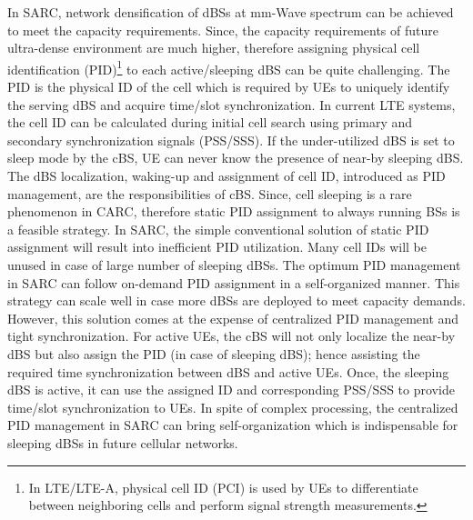\documentclass[article,10pt,twocolumn]{IEEEtran}
\begin{document}
In SARC, network densification of dBSs at mm-Wave spectrum can be achieved to meet the capacity requirements. Since, the capacity requirements of future ultra-dense environment are much higher, therefore assigning physical cell identification (PID)\footnote{In LTE/LTE-A, physical cell ID (PCI) is used by UEs to differentiate between neighboring cells and perform signal strength measurements.} to each active/sleeping dBS can be quite challenging. The PID is the physical ID of the cell which is required by UEs to uniquely identify the serving dBS and acquire time/slot synchronization. In current LTE systems, the cell ID can be calculated during initial cell search using primary and secondary synchronization signals (PSS/SSS). If the under-utilized dBS is set to sleep mode by the cBS, UE can never know the presence of near-by sleeping dBS. The dBS localization, waking-up and assignment of cell ID, introduced as PID management, are the responsibilities of cBS. Since, cell sleeping is a rare phenomenon in CARC, therefore static PID assignment to always running BSs is a feasible strategy. In SARC, the simple conventional solution of static PID assignment will result into inefficient PID utilization. Many cell IDs will be unused in case of large number of sleeping dBSs. The optimum PID management in SARC can follow on-demand PID assignment in a self-organized manner. This strategy can scale well in case more dBSs are deployed to meet capacity demands. However, this solution comes at the expense of centralized PID management and tight synchronization. For active UEs, the cBS will not only localize the near-by dBS but also assign the PID (in case of sleeping dBS); hence assisting the required time synchronization between dBS and active UEs. Once, the sleeping dBS is active, it can use the assigned ID and corresponding PSS/SSS to provide time/slot synchronization to UEs. In spite of complex processing, the centralized PID management in SARC can bring self-organization which is indispensable for sleeping dBSs in future cellular networks.
\end{document}
